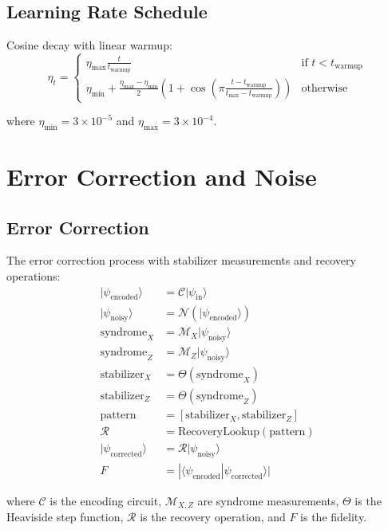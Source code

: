 \documentclass{article}
\begin{document}
\subsection{Learning Rate Schedule}
Cosine decay with linear warmup:
\begin{equation}
\eta_t = \begin{cases}
\eta_{\text{max}}\frac{t}{t_{\text{warmup}}} & \text{if } t < t_{\text{warmup}} \\
\eta_{\text{min}} + \frac{\eta_{\text{max}}-\eta_{\text{min}}}{2}(1 + \cos(\pi\frac{t-t_{\text{warmup}}}{t_{\text{max}}-t_{\text{warmup}}})) & \text{otherwise}
\end{cases}
\end{equation}

where $\eta_{\text{min}}=3\times10^{-5}$ and $\eta_{\text{max}}=3\times10^{-4}$.

\section{Error Correction and Noise}

\subsection{Error Correction}
The error correction process with stabilizer measurements and recovery operations:
\begin{align*}
|\psi_{\text{encoded}}\rangle &= \mathcal{C}|\psi_{\text{in}}\rangle \\
|\psi_{\text{noisy}}\rangle &= \mathcal{N}(|\psi_{\text{encoded}}\rangle) \\
\text{syndrome}_X &= \mathcal{M}_X|\psi_{\text{noisy}}\rangle \\
\text{syndrome}_Z &= \mathcal{M}_Z|\psi_{\text{noisy}}\rangle \\
\text{stabilizer}_X &= \Theta(\text{syndrome}_X) \\
\text{stabilizer}_Z &= \Theta(\text{syndrome}_Z) \\
\text{pattern} &= [\text{stabilizer}_X, \text{stabilizer}_Z] \\
\mathcal{R} &= \text{RecoveryLookup}(\text{pattern}) \\
|\psi_{\text{corrected}}\rangle &= \mathcal{R}|\psi_{\text{noisy}}\rangle \\
F &= |\langle\psi_{\text{encoded}}|\psi_{\text{corrected}}\rangle|
\end{align*}

where $\mathcal{C}$ is the encoding circuit, $\mathcal{M}_{X,Z}$ are syndrome measurements, $\Theta$ is the Heaviside step function, $\mathcal{R}$ is the recovery operation, and $F$ is the fidelity.
\end{document}
